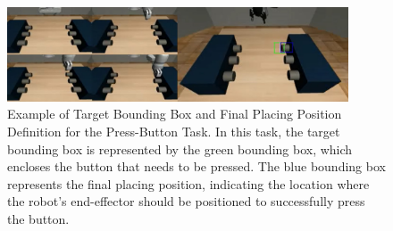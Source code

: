 \begin{figure}[t]
    \centering
    \includegraphics[width=0.9\textwidth]{figures/images/ch2/press_button_target_placing.jpg}
    \caption{Example of Target Bounding Box and Final Placing Position Definition for the Press-Button Task. In this task, the target bounding box is represented by the green bounding box, which encloses the button that needs to be pressed. The blue bounding box represents the final placing position, indicating the location where the robot's end-effector should be positioned to successfully press the button.}
    \label{fig:press_button_target_placing}
\end{figure}

